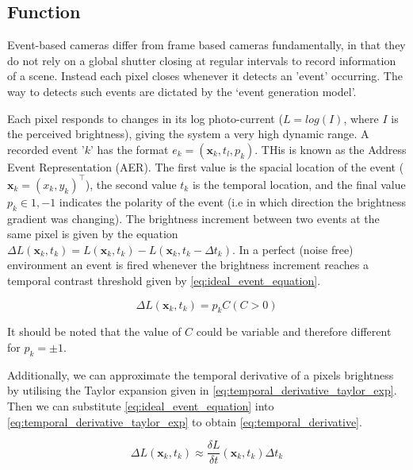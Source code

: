 \subsection{Function} \label{ssec:event_camera_function}
Event-based cameras differ from frame based cameras fundamentally, in that they do not rely on a global shutter closing at regular intervals to record information of a scene. Instead each pixel closes whenever it detects an 'event' occurring. The way to detects such events are dictated by the `event generation model'\cite{EventBasedVisionASurvery}.

Each pixel responds to changes in its log photo-current ($ L = log(I) $, where $I$ is the perceived brightness), giving the system a very high dynamic range. A recorded event '$ k $' has the format $ e_k = (\boldsymbol{\mathbf{x}}_k, t_l, p_k ) $. THis is known as the Address Event Representation (AER). The first value is the spacial location of the event ($ \boldsymbol{\mathbf{x}}_k = (x_k, y_k)^\top $), the second value $ t_k $ is the temporal location, and the final value $ p_k \in {1, -1} $ indicates the polarity of the event (i.e in which direction the brightness gradient was changing). The brightness increment between two events at the same pixel is given by the equation $ \Delta L(\boldsymbol{\mathbf{x}}_k, t_k) = L(\boldsymbol{\mathbf{x}}_k, t_k) - L(\boldsymbol{\mathbf{x}}_k, t_k - \Delta t_k) $. In a perfect (noise free) environment an event is fired whenever the brightness increment reaches a temporal contrast threshold given by \autoref{eq:ideal_event_equation}.

\begin{equation}
      \Delta L(\boldsymbol{\mathbf{x}}_k, t_k) = p_k C ( C > 0 )
      \label{eq:ideal_event_equation}
\end{equation}

It should be noted that the value of $ C $ could be variable and therefore different for $ p_k = \pm 1 $.

Additionally, we can approximate the temporal derivative of a pixels brightness by utilising the Taylor expansion given in \autoref{eq:temporal_derivative_taylor_exp}. Then we can substitute \autoref{eq:ideal_event_equation} into \autoref{eq:temporal_derivative_taylor_exp} to obtain \autoref{eq:temporal_derivative}.

\begin{equation}
      \Delta L(\boldsymbol{\mathbf{x}}_k, t_k) \approx \frac{\delta L}{\delta t}(\boldsymbol{\mathbf{x}}_k, t_k)\Delta t_k
      \label{eq:temporal_derivative_taylor_exp}
\end{equation}

